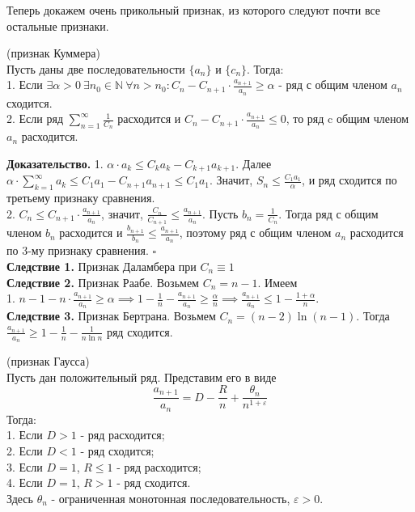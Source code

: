 Теперь докажем очень прикольный признак, из которого следуют почти все 
остальные признаки. 
\begin{theor}
    (признак Куммера)\\
    Пусть даны две последовательности $\{a_n\}$ и  $\{c_n\}$. Тогда:\\
    1. Если $\exists \alpha>0~\exists n_0\in\mathbb{N}~\forall n>n_0:
    C_n-C_{n+1}\cdot \frac{a_{n+1}}{a_n}\geqslant\alpha$ - ряд с общим членом
    $a_n$ сходится.\\
    2. Если ряд $\sum\limits_{n=1}^{\infty} \frac{1}{C_n}$ расходится 
    и $C_n-C_{n+1}\cdot\frac{a_{n+1}}{a_n}\leqslant 0$, то ряд c общим
    членом $a_n$ расходится.
\end{theor}
\textbf{Доказательство.} %
1. $\alpha\cdot a_k\leqslant C_ka_k-C_{k+1}a_{k+1}$. Далее 
$\alpha\cdot \sum\limits_{k=1}^{\infty} a_k\leqslant C_1a_1-C_{n+1}a_{n+1}
\leqslant C_1a_1$. Значит, $S_n\leqslant \frac{C_1a_1}{\alpha}$, и ряд
сходится по третьему признаку сравнения.\\
2. $C_n\leqslant C_{n+1}\cdot \frac{a_{n+1}}{a_n}$, значит,
$\frac{C_n}{C_{n+1}}\leqslant \frac{a_{n+1}}{a_n}$. Пусть $b_n=\frac{1}{C_n}$.
Тогда ряд с общим членом $b_n$ расходится и $\frac{b_{n+1}}{b_n}\leqslant 
\frac{a_{n+1}}{a_n}$, поэтому ряд с общим членом $a_n$ расходится по 3-му
признаку сравнения. $\square$ \\
\textbf{Следствие 1.} Признак Даламбера при $C_n\equiv1$\\
\textbf{Следствие 2.} Признак Раабе. Возьмем $C_n=n-1$. Имеем\\ 
1. $n-1-n\cdot \frac{a_{n+1}}{a_n}\geqslant\alpha\implies1-\frac{1}{n}
-\frac{a_{n+1}}{a_n}\geqslant\frac{\alpha}{n}\implies\frac{a_{n+1}}{a_n}
\leqslant 1-\frac{1+\alpha}{n}$.\\
\textbf{Следствие 3.} Признак Бертрана. Возьмем $C_n=(n-2)\ln(n-1)$. 
Тогда $\frac{a_{n+1}}{a_n}\geqslant1-\frac{1}{n}-\frac{1}{n\ln{n}}$
ряд сходится.
\begin{theor}
    (признак Гаусса)\\
    Пусть дан положительный ряд. Представим его в виде
    $$\frac{a_{n+1}}{a_n}=D-\frac{R}{n}+ \frac{\theta_n}{n^{1+\varepsilon}}$$ 
    Тогда:\\
    1. Если $D>1$ - ряд расходится;\\
    2. Если $D<1$ - ряд сходится;\\
    3. Если $D=1$,  $R\leqslant 1$ - ряд расходится;\\
    4. Если $D=1$,  $R>1$ - ряд сходится.\\
    Здесь $\theta_n$ - ограниченная монотонная последовательность,
     $\varepsilon>0$.
\end{theor}
